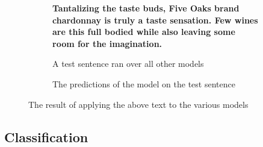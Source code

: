 \documentclass[12pt]{IEEEtran}
\begin{document}
\begin{figure}
    \centering
    \begin{subfigure}{\columnwidth}
        \centering
        \textbf{Tantalizing the taste buds, Five Oaks brand chardonnay is truly 
        a taste sensation. Few wines are this full bodied while also leaving some
        room for the imagination.}
        \caption{A test sentence ran over all other models}
    \end{subfigure}
    \begin{subfigure}{\columnwidth}
        \centering
        \caption{The predictions of the model on the test sentence}
    \end{subfigure}
    \caption{ The result of applying the above text to the various models}
    \label{regression_ex}
\end{figure}

\subsection{Classification}
\end{document}
